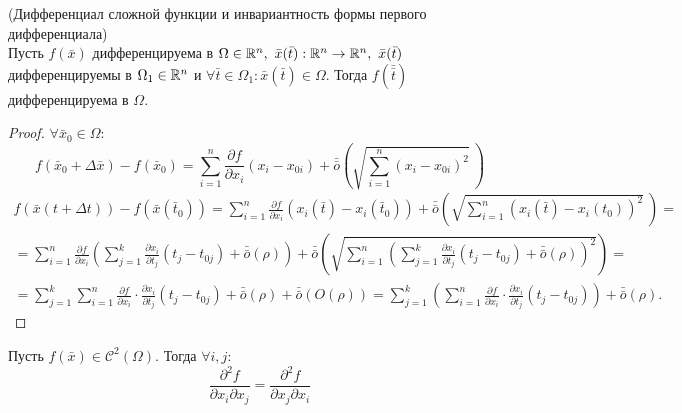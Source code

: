\begin{theorem} (Дифференциал сложной функции и инвариантность формы первого дифференциала)\\
    Пусть $f(\bar{x})$ дифференцируема в $\Omega\in \R^n,\ \bar{x}(\bar{t}): \R^n\to \R^n,\ \bar{x}(\bar{t})$ дифференцируемы в $\Omega_1\in \mathbb{R}^n$ и $\forall \bar{t}\in \Omega_1: \bar{x}(\bar{t})\in \Omega$. Тогда $f(\bar{\bar{t}})$ дифференцируема в $\Omega$.
\end{theorem} 
\begin{proof}
    $\forall \bar{x}_0\in \Omega$:
    \[f(\bar{x}_0+\Delta \bar{x})-f(\bar{x}_0)=\sum\limits_{i=1}^{n}\frac{\partial {f}}{\partial {x_i}}(x_i-x_{0i})+\bar{\bar{o}}{\left(\sqrt{\sum\limits_{i=1}^{n}(x_i-x_{0i})^2}\ \right)}\]
    \begin{multline*}
        f(\bar{x}(t+\Delta t))-f(\bar{x}(\bar{t}_0))=\sum\limits_{i=1}^{n}\frac{\partial {f}}{\partial {x_i}}(x_i(\bar{t})-x_i(\bar{t}_0))+\bar{\bar{o}}{\left(\sqrt{\sum\limits_{i=1}^{n}(x_i(\bar{t})-x_i(t_0))^2}\ \right)}=\\
        =\sum\limits_{i=1}^{n}\frac{\partial {f}}{\partial {x_i}}\left(\sum\limits_{j=1}^{k}\frac{\partial {x_i}}{\partial {t_j}}(t_j-t_{0j})+\bar{\bar{o}}{(\rho)}\right)+\bar{\bar{o}}{\left(\sqrt{\sum\limits_{i=1}^{n}\left(\sum\limits_{j=1}^{k}\frac{\partial {x_i}}{\partial {t_j}}(t_j-t_{0j})+\bar{\bar{o}}{(\rho)}\right)^2}\right)}=\\
        =\sum\limits_{j=1}^{k}\sum\limits_{i=1}^{n}\frac{\partial {f}}{\partial {x_i}}\cdot \frac{\partial {x_i}}{\partial {t_j}}(t_j-t_{0j})+\bar{\bar{o}}{(\rho)}+\bar{\bar{o}}{(O(\rho))}=\sum\limits_{j=1}^{k}\left(\sum\limits_{i=1}^{n}\frac{\partial {f}}{\partial {x_i}}\cdot \frac{\partial {x_i}}{\partial {t_j}}(t_j-t_{0j})\right)+\bar{\bar{o}}{(\rho)}.
    \end{multline*}
\end{proof} 
\begin{theorem}
    Пусть $f(\bar{x})\in \mathcal{C}^2(\Omega)$. Тогда $\forall i,j:$
    \[\frac{\partial^2 {f}}{\partial {x_i}\partial{x_j}}=\frac{\partial^2 {f}}{\partial {x_j}\partial{x_i}}\]
\end{theorem} 
